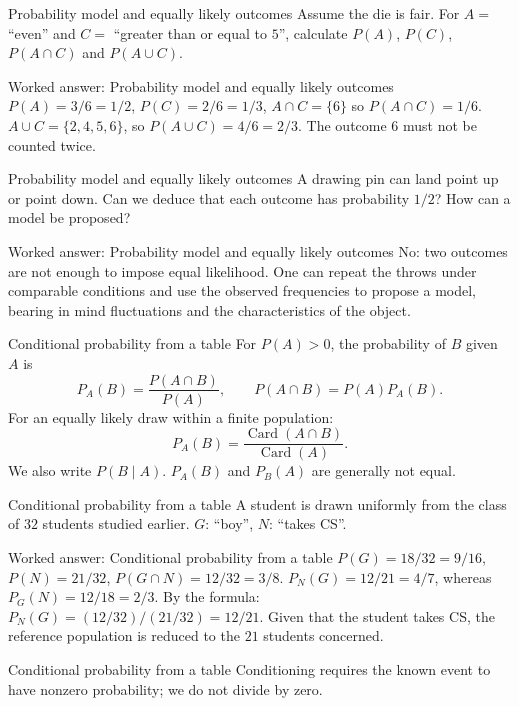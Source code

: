 \documentclass[aspectratio=169,10pt]{beamer}
\providecommand{\Card}{\operatorname{Card}}
\begin{document}
\begin{frame}{Probability model and equally likely outcomes}
Assume the die is fair. For \(A=\) “even” and \(C=\) “greater than or equal to \(5\)”, calculate \(P(A)\), \(P(C)\), \(P(A\cap C)\) and \(P(A\cup C)\).
\end{frame}
\begin{frame}{Worked answer: Probability model and equally likely outcomes}
\(P(A)=3/6=1/2\), \(P(C)=2/6=1/3\), \(A\cap C=\{6\}\) so \(P(A\cap C)=1/6\). \(A\cup C=\{2,4,5,6\}\), so \(P(A\cup C)=4/6=2/3\). The outcome \(6\) must not be counted twice.
\end{frame}
\begin{frame}{Probability model and equally likely outcomes}
A drawing pin can land point up or point down. Can we deduce that each outcome has probability \(1/2\)? How can a model be proposed?
\end{frame}
\begin{frame}{Worked answer: Probability model and equally likely outcomes}
No: two outcomes are not enough to impose equal likelihood. One can repeat the throws under comparable conditions and use the observed frequencies to propose a model, bearing in mind fluctuations and the characteristics of the object.
\end{frame}
\begin{frame}{Conditional probability from a table}
For \(P(A)>0\), the probability of \(B\) given \(A\) is
\[P_A(B)=\dfrac{P(A\cap B)}{P(A)},\qquad P(A\cap B)=P(A)P_A(B).\]
For an equally likely draw within a finite population:
\[P_A(B)=\dfrac{\Card(A\cap B)}{\Card(A)}.\]
We also write \(P(B\mid A)\). \(P_A(B)\) and \(P_B(A)\) are generally not equal.
\end{frame}
\begin{frame}{Conditional probability from a table}
A student is drawn uniformly from the class of \(32\) students studied earlier. \(G\): “boy”, \(N\): “takes CS”.
\end{frame}
\begin{frame}{Worked answer: Conditional probability from a table}
\(P(G)=18/32=9/16\), \(P(N)=21/32\), \(P(G\cap N)=12/32=3/8\).
\(P_N(G)=12/21=4/7\), whereas \(P_G(N)=12/18=2/3\).
By the formula: \(P_N(G)=(12/32)/(21/32)=12/21\). Given that the student takes CS, the reference population is reduced to the \(21\) students concerned.
\end{frame}
\begin{frame}{Conditional probability from a table}
Conditioning requires the known event to have nonzero probability; we do not divide by zero.
\end{frame}
\end{document}
